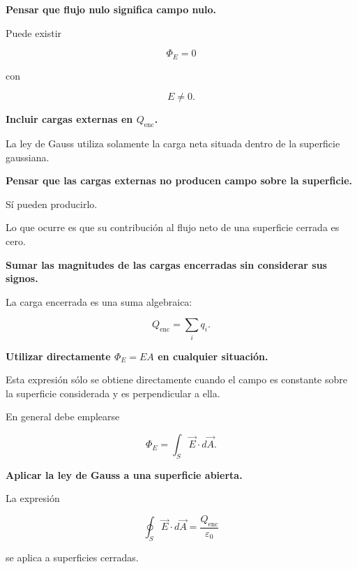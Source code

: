 \begin{errorfrecuente}

\textbf{Pensar que flujo nulo significa campo nulo.}

Puede existir

\[
\Phi_E=0
\]

con

\[
E\neq0.
\]

\end{errorfrecuente}


\begin{errorfrecuente}

\textbf{Incluir cargas externas en \(Q_{\text{enc}}\).}

La ley de Gauss utiliza solamente la carga neta situada dentro de la superficie
gaussiana.

\end{errorfrecuente}


\begin{errorfrecuente}

\textbf{Pensar que las cargas externas no producen campo sobre la superficie.}

Sí pueden producirlo.

Lo que ocurre es que su contribución al flujo neto de una superficie cerrada es cero.

\end{errorfrecuente}


\begin{errorfrecuente}

\textbf{Sumar las magnitudes de las cargas encerradas sin considerar sus signos.}

La carga encerrada es una suma algebraica:

\[
Q_{\text{enc}}=\sum_iq_i.
\]

\end{errorfrecuente}


\begin{errorfrecuente}

\textbf{Utilizar directamente \(\Phi_E=EA\) en cualquier situación.}

Esta expresión sólo se obtiene directamente cuando el campo es constante sobre la
superficie considerada y es perpendicular a ella.

En general debe emplearse

\[
\Phi_E=\int_S\vec E\cdot d\vec A.
\]

\end{errorfrecuente}


\begin{errorfrecuente}

\textbf{Aplicar la ley de Gauss a una superficie abierta.}

La expresión

\[
\oint_S\vec E\cdot d\vec A
=
\frac{Q_{\text{enc}}}{\varepsilon_0}
\]

se aplica a superficies cerradas.

\end{errorfrecuente}


